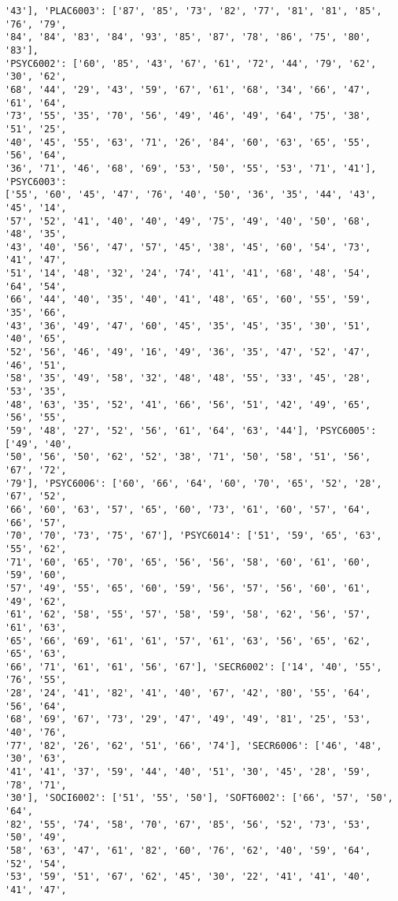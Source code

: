 \documentclass[11pt]{article}
\begin{document}
\begin{Verbatim}[commandchars=\\\{\}]
'43'], 'PLAC6003': ['87', '85', '73', '82', '77', '81', '81', '85', '76', '79',
'84', '84', '83', '84', '93', '85', '87', '78', '86', '75', '80', '83'],
'PSYC6002': ['60', '85', '43', '67', '61', '72', '44', '79', '62', '30', '62',
'68', '44', '29', '43', '59', '67', '61', '68', '34', '66', '47', '61', '64',
'73', '55', '35', '70', '56', '49', '46', '49', '64', '75', '38', '51', '25',
'40', '45', '55', '63', '71', '26', '84', '60', '63', '65', '55', '56', '64',
'36', '71', '46', '68', '69', '53', '50', '55', '53', '71', '41'], 'PSYC6003':
['55', '60', '45', '47', '76', '40', '50', '36', '35', '44', '43', '45', '14',
'57', '52', '41', '40', '40', '49', '75', '49', '40', '50', '68', '48', '35',
'43', '40', '56', '47', '57', '45', '38', '45', '60', '54', '73', '41', '47',
'51', '14', '48', '32', '24', '74', '41', '41', '68', '48', '54', '64', '54',
'66', '44', '40', '35', '40', '41', '48', '65', '60', '55', '59', '35', '66',
'43', '36', '49', '47', '60', '45', '35', '45', '35', '30', '51', '40', '65',
'52', '56', '46', '49', '16', '49', '36', '35', '47', '52', '47', '46', '51',
'58', '35', '49', '58', '32', '48', '48', '55', '33', '45', '28', '53', '35',
'48', '63', '35', '52', '41', '66', '56', '51', '42', '49', '65', '56', '55',
'59', '48', '27', '52', '56', '61', '64', '63', '44'], 'PSYC6005': ['49', '40',
'50', '56', '50', '62', '52', '38', '71', '50', '58', '51', '56', '67', '72',
'79'], 'PSYC6006': ['60', '66', '64', '60', '70', '65', '52', '28', '67', '52',
'66', '60', '63', '57', '65', '60', '73', '61', '60', '57', '64', '66', '57',
'70', '70', '73', '75', '67'], 'PSYC6014': ['51', '59', '65', '63', '55', '62',
'71', '60', '65', '70', '65', '56', '56', '58', '60', '61', '60', '59', '60',
'57', '49', '55', '65', '60', '59', '56', '57', '56', '60', '61', '49', '62',
'61', '62', '58', '55', '57', '58', '59', '58', '62', '56', '57', '61', '63',
'65', '66', '69', '61', '61', '57', '61', '63', '56', '65', '62', '65', '63',
'66', '71', '61', '61', '56', '67'], 'SECR6002': ['14', '40', '55', '76', '55',
'28', '24', '41', '82', '41', '40', '67', '42', '80', '55', '64', '56', '64',
'68', '69', '67', '73', '29', '47', '49', '49', '81', '25', '53', '40', '76',
'77', '82', '26', '62', '51', '66', '74'], 'SECR6006': ['46', '48', '30', '63',
'41', '41', '37', '59', '44', '40', '51', '30', '45', '28', '59', '78', '71',
'30'], 'SOCI6002': ['51', '55', '50'], 'SOFT6002': ['66', '57', '50', '64',
'82', '55', '74', '58', '70', '67', '85', '56', '52', '73', '53', '50', '49',
'58', '63', '47', '61', '82', '60', '76', '62', '40', '59', '64', '52', '54',
'53', '59', '51', '67', '62', '45', '30', '22', '41', '41', '40', '41', '47',

\end{Verbatim}
\end{document}
